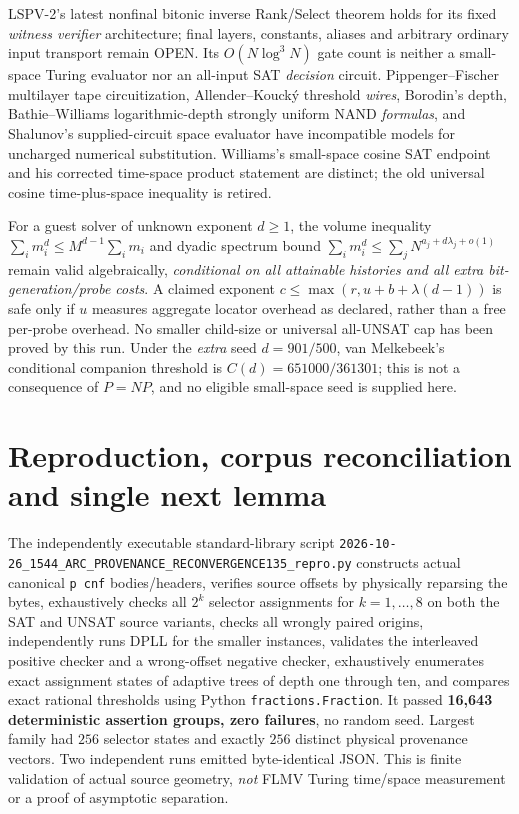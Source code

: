 \documentclass[11pt]{article}
\begin{document}
LSPV-2's latest nonfinal bitonic inverse Rank/Select theorem holds for its fixed \emph{witness verifier} architecture; final layers, constants, aliases and arbitrary ordinary input transport remain OPEN. Its \(O(N\log^3N)\) gate count is neither a small-space Turing evaluator nor an all-input SAT \emph{decision} circuit. Pippenger--Fischer multilayer tape circuitization, Allender--Kouck\'y threshold \emph{wires}, Borodin's depth, Bathie--Williams logarithmic-depth strongly uniform NAND \emph{formulas}, and Shalunov's supplied-circuit space evaluator have incompatible models for uncharged numerical substitution. Williams's small-space cosine SAT endpoint and his corrected time-space product statement are distinct; the old universal cosine time-plus-space inequality is retired.

For a guest solver of unknown exponent \(d\ge1\), the volume inequality \(\sum_i m_i^d\le M^{d-1}\sum_i m_i\) and dyadic spectrum bound \(\sum_i m_i^d\le\sum_jN^{a_j+d\lambda_j+o(1)}\) remain valid algebraically, \emph{conditional on all attainable histories and all extra bit-generation/probe costs}. A claimed exponent \(c\le\max(r,u+b+\lambda(d-1))\) is safe only if \(u\) measures aggregate locator overhead as declared, rather than a free per-probe overhead. No smaller child-size or universal all-UNSAT cap has been proved by this run. Under the \emph{extra} seed \(d=901/500\), van Melkebeek's conditional companion threshold is \(C(d)=651000/361301\); this is not a consequence of \(P=NP\), and no eligible small-space seed is supplied here.

\section{Reproduction, corpus reconciliation and single next lemma}
The independently executable standard-library script \texttt{2026-10-26\_1544\_ARC\_PROVENANCE\_RECONVERGENCE135\_repro.py} constructs actual canonical \texttt{p cnf} bodies/headers, verifies source offsets by physically reparsing the bytes, exhaustively checks all \(2^k\) selector assignments for \(k=1,\dots,8\) on both the SAT and UNSAT source variants, checks all wrongly paired origins, independently runs DPLL for the smaller instances, validates the interleaved positive checker and a wrong-offset negative checker, exhaustively enumerates exact assignment states of adaptive trees of depth one through ten, and compares exact rational thresholds using Python \texttt{fractions.Fraction}. It passed \textbf{16,643 deterministic assertion groups, zero failures}, no random seed. Largest family had \(256\) selector states and exactly \(256\) distinct physical provenance vectors. Two independent runs emitted byte-identical JSON. This is finite validation of actual source geometry, \emph{not} FLMV Turing time/space measurement or a proof of asymptotic separation.
\end{document}
